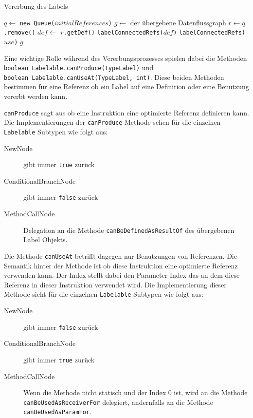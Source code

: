 \begin{algorithm}[H]
	\caption{Vererbung des Labels}\label{alg:analyze}
	\begin{algorithmic}[1]
		\STATE $q \gets$ \texttt{new Queue($initialReferences$)}
		\STATE $g \gets$ der übergebene Datenflussgraph
			\STATE $r \gets q$\texttt{.remove()}
				\STATE $def \gets$ \texttt{$r$.getDef()}
					\STATE \texttt{labelConnectedRefs($def$)}
				\ENDIF
						\STATE \texttt{labelConnectedRefs($use$)}
					\ENDIF
				\ENDFOR
			\ENDIF
		\ENDWHILE
		\RETURN $g$
	\end{algorithmic}
\end{algorithm}

Eine wichtige Rolle während des Vererbungsprozesses spielen dabei die Methoden 
\texttt{boolean Labelable.canProduce(TypeLabel)} und \\
\texttt{boolean Labelable.canUseAt(TypeLabel, int)}. Diese beiden Methoden bestimmen 
für eine Referenz ob ein Label auf eine Definition oder eine Benutzung vererbt werden kann.

\texttt{canProduce} sagt aus ob eine Instruktion eine optimierte Referenz definieren kann. 
Die Implementierungen der \texttt{canProduce} Methode sehen für die einzelnen \texttt{Labelable}
Subtypen wie folgt aus:

\begin{description}
	\item[NewNode] gibt immer \texttt{true} zurück
	\item[ConditionalBranchNode] gibt immer \texttt{false} zurück
	\item[MethodCallNode] Delegation an die Methode \texttt{canBeDefinedAsResultOf} des 
	übergebenen Label Objekts.
\end{description}

Die Methode \texttt{canUseAt} betrifft dagegen nur Benutzungen von Referenzen. Die Semantik
hinter der Methode ist ob diese Instruktion eine optimierte Referenz verwenden kann. Der Index 
stellt dabei den Parameter Index das an dem diese Referenz in dieser Instruktion verwendet wird. 
Die Implementierung dieser Methode sieht für die einzelnen \texttt{Labelable}
Subtypen wie folgt aus:

\begin{description}
	\item[NewNode] gibt immer \texttt{false} zurück
	\item[ConditionalBranchNode] gibt immer \texttt{true} zurück
	\item[MethodCallNode] Wenn die Methode nicht statisch und der Index 0 ist, wird an die Methode
	\texttt{canBeUsedAsReceiverFor} delegiert, andernfalls an die Methode \texttt{canBeUsedAsParamFor}.
\end{description}

